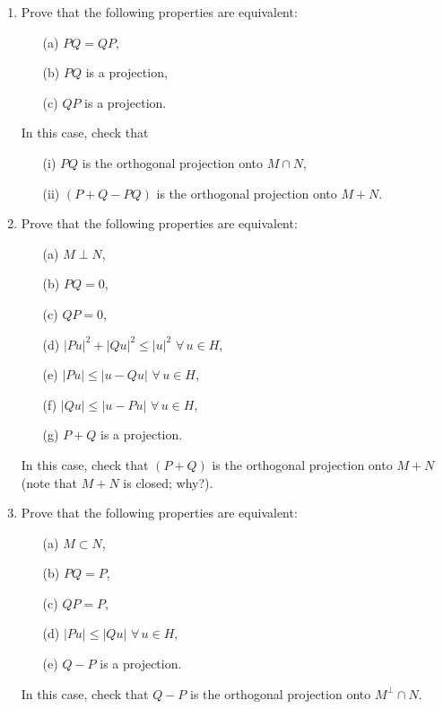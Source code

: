 \documentclass[12pt]{article}
\newcommand{\abs}[1]{\left|#1\right|}
\begin{document}
\begin{enumerate}
\item Prove that the following properties are equivalent:
\begin{itemize}
    \item[(a)] $PQ = QP$,
    \item[(b)] $PQ$ is a projection,
    \item[(c)] $QP$ is a projection.
\end{itemize}
In this case, check that
\begin{itemize}
    \item[(i)] $PQ$ is the orthogonal projection onto $M \cap N$,
    \item[(ii)] $(P + Q - PQ)$ is the orthogonal projection onto $M + N$.
\end{itemize}
 
\item Prove that the following properties are equivalent:
\begin{itemize}
    \item[(a)] $M \perp N$,
    \item[(b)] $PQ = 0$,
    \item[(c)] $QP = 0$,
    \item[(d)] $\abs{Pu}^2 + \abs{Qu}^2 \le \abs{u}^2$ $\forall\, u \in H$,
    \item[(e)] $\abs{Pu} \le \abs{u - Qu}$ $\forall\, u \in H$,
    \item[(f)] $\abs{Qu} \le \abs{u - Pu}$ $\forall\, u \in H$,
    \item[(g)] $P + Q$ is a projection.
\end{itemize}
In this case, check that $(P + Q)$ is the orthogonal projection onto $M + N$ (note
that $M + N$ is closed; why?).
 
\item Prove that the following properties are equivalent:
\begin{itemize}
    \item[(a)] $M \subset N$,
    \item[(b)] $PQ = P$,
    \item[(c)] $QP = P$,
    \item[(d)] $\abs{Pu} \le \abs{Qu}$ $\forall\, u \in H$,
    \item[(e)] $Q - P$ is a projection.
\end{itemize}
In this case, check that $Q - P$ is the orthogonal projection onto $M^\perp \cap N$.
\end{enumerate}
 
\end{document}
